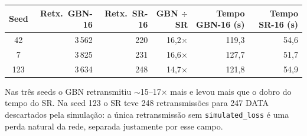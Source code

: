 \documentclass[11pt,a4paper]{article}
\newcommand{\cod}[1]{\textcolor{codverde}{\texttt{\small #1}}}
\begin{document}
\begin{center}\small
\begin{tabular}{@{}c r r r r r@{}}
\toprule
\textbf{Seed} & \textbf{Retx.\ GBN-16} & \textbf{Retx.\ SR-16} & \textbf{GBN $\div$ SR} & \textbf{Tempo GBN-16 (s)} & \textbf{Tempo SR-16 (s)}\\
\midrule
42  & 3\,562 & 220 & 16,2$\times$ & 119,3 & 54,6\\
7   & 3\,825 & 231 & 16,6$\times$ & 127,7 & 51,7\\
123 & 3\,634 & 248 & 14,7$\times$ & 121,8 & 54,9\\
\bottomrule
\end{tabular}
\end{center}

Nas três seeds o GBN retransmitiu $\sim$15--17$\times$ mais e levou mais que o dobro do tempo do SR. Na seed 123 o SR teve 248 retransmissões para 247 DATA descartados pela simulação: a única retransmissão sem \cod{simulated\_loss} é uma perda natural da rede, separada justamente por esse campo.
\end{document}
